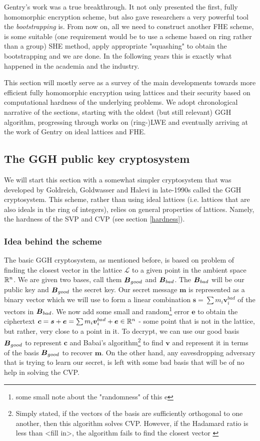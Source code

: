 Gentry's work was a true breakthrough. It not only presented the first, fully homomorphic encryption scheme, but also gave researchers a very powerful tool the \textit{bootstrapping} is. From now on, all we need to construct another FHE scheme, is some suitable (one requirement would be to use a scheme based on ring rather than a group) SHE method, apply appropriate "squashing" to obtain the bootstrapping and we are done. In the following years this is exactly what happened in the academia and the industry.

This section will mostly serve as a survey of the main developments towards more efficient fully homomorphic encryption using lattices and their security based on computational hardness of the underlying problems. We adopt chronological narrative of the sections, starting with the oldest (but still relevant) GGH algorithm, progressing through works on (ring-)LWE and eventually arriving at the work of Gentry \cite{gentry_phd} on ideal lattices and FHE.

\subsection{The GGH public key cryptosystem}
We will start this section with a somewhat simpler cryptosystem that was developed by Goldreich, Goldwasser and Halevi in late-1990s \cite{ggh} called the GGH cryptosystem. This scheme, rather than using ideal lattices (i.e. lattices that are also ideals in the ring of integers), relies on general properties of lattices. Namely, the hardness of the SVP and CVP (see section \ref{hardness}).

\subsubsection*{Idea behind the scheme}
The basic GGH cryptosystem, as mentioned before, is based on problem of finding the closest vector in the lattice $\mathcal{L}$ to a given point in the ambient space $\mathbb{R}^n$. We are given two bases, call them $\boldsymbol{B}_{good}$ and $\boldsymbol{B}_{bad}$. The $\boldsymbol{B}_{bad}$ will be our public key and $\boldsymbol{B}_{good}$ the secret key. Our secret message $\bm{m}$ is represented as a binary vector which we will use to form a linear combination $\bm{s} = \sum m_i \bm{v}_i^{bad}$ of the vectors in $\boldsymbol{B}_{bad}$. We now add some small and random\footnote{some small note about the "randomness" of this e} error $\bm{e}$ to obtain the ciphertext $\boldsymbol{c} = \boldsymbol{s} + \boldsymbol{e} = \sum m_i \boldsymbol{v}_i^{bad} + \boldsymbol{e} \in \mathbb{R}^n$ - some point that is not in the lattice, but rather, very close to a point in it.
To decrypt, we can use our good basis $\boldsymbol{B}_{good}$ to represent $\bm{c}$ and Babai's algorithm\footnote{Simply stated, if the vectors of the basis are sufficiently orthogonal to one another, then this algorithm solves CVP. However, if the Hadamard ratio is less than <fill in>, the algorithm fails to find the closest vector \cite{babai}} to find $\bm{v}$ and represent it in terms of the basis $\boldsymbol{B}_{good}$  to recover $\bm{m}$. On the other hand, any eavesdropping adversary that is trying to learn our secret, is left with some bad basis that will be of no help in solving the CVP.

